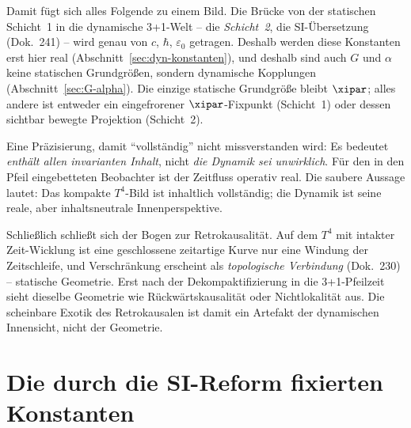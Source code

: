 Damit fügt sich alles Folgende zu einem Bild. Die Brücke von der statischen
Schicht~1 in die dynamische 3+1-Welt -- die \emph{Schicht~2}, die SI-Übersetzung
(Dok.~241) -- wird genau von $c$, $\hbar$, $\varepsilon_0$ getragen. Deshalb werden
diese Konstanten erst hier real (Abschnitt~\ref{sec:dyn-konstanten}), und deshalb
sind auch $G$ und $\alpha$ keine statischen Grundgrößen, sondern dynamische
Kopplungen (Abschnitt~\ref{sec:G-alpha}). Die einzige statische Grundgröße bleibt
$\xipar$; alles andere ist entweder ein eingefrorener $\xipar$-Fixpunkt
(Schicht~1) oder dessen sichtbar bewegte Projektion (Schicht~2).

Eine Präzisierung, damit ``vollständig'' nicht missverstanden wird: Es bedeutet
\emph{enthält allen invarianten Inhalt}, nicht \emph{die Dynamik sei unwirklich}.
Für den in den Pfeil eingebetteten Beobachter ist der Zeitfluss operativ real. Die
saubere Aussage lautet: Das kompakte $T^4$-Bild ist inhaltlich vollständig; die
Dynamik ist seine reale, aber inhaltsneutrale Innenperspektive.

Schließlich schließt sich der Bogen zur Retrokausalität. Auf dem $T^4$ mit intakter
Zeit-Wicklung ist eine geschlossene zeitartige Kurve nur eine Windung der
Zeitschleife, und Verschränkung erscheint als \emph{topologische Verbindung}
(Dok.~230) -- statische Geometrie. Erst nach der Dekompaktifizierung in die
3+1-Pfeilzeit sieht dieselbe Geometrie wie Rückwärtskausalität oder Nichtlokalität
aus. Die scheinbare Exotik des Retrokausalen ist damit ein Artefakt der
dynamischen Innensicht, nicht der Geometrie.

\section{Die durch die SI-Reform fixierten Konstanten}

\begin{table}[htbp]
  \centering
  \caption{Die durch die SI-Reform 2019 fixierten Konstanten (die ``Maschinerie'').
           Sie tragen keine Physik, nur Maßstab, und werden in natürlichen
           Einheiten zu~$1$.}
  \label{tab:si-fixiert}
\end{table}


